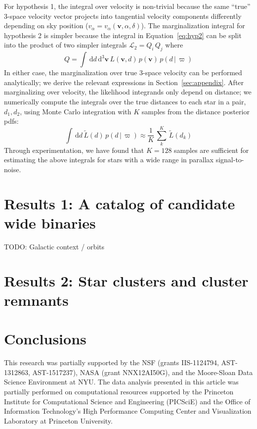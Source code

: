 \documentclass[manuscript, letterpaper]{aastex6}
\newcommand{\acronym}[1]{{\small{#1}}}
\newcommand{\sectionname}{Section}
\newcommand{\eqname}{Equation}
\newcommand{\given}{\,|\,}
\newcommand{\dd}{\mathrm{d}}
\newcommand{\bs}[1]{\boldsymbol{#1}}
\newcommand{\todo}[1]{{\color{red}TODO: #1}}
\begin{document}
For hypothesis 1, the integral over velocity is non-trivial because the same
``true'' 3-space velocity vector projects into tangential velocity components
differently depending on sky position ($v_\alpha = v_\alpha(\bs{v}, \alpha,
\delta)$). The marginalization integral for hypothesis 2 is simpler because the
integral in \eqname~\ref{eq:hyp2} can be split into the product of two simpler
integrals $\mathcal{L}_2 = Q_i \, Q_j$ where
\begin{equation}
  Q = \int \, \dd d \, \dd^3 \bs{v} \, L(\bs{v}, d) \, p(\bs{v}) \, p(d\given\varpi)
\end{equation}
In either case, the marginalization over true 3-space velocity can be performed
analytically; we derive the relevant expressions in
\sectionname~\ref{sec:appendix}. After marginalizing over velocity, the
likelihood integrands only depend on distance; we numerically compute the
integrals over the true distances to each star in a pair, $d_1,d_2$, using Monte
Carlo integration with $K$ samples from the distance posterior pdfs:
\begin{equation}
  \int \, \dd d \, \tilde{L}(d) \, p(d\given\varpi) \approx
    \frac{1}{K} \, \sum_k^K \, \tilde{L}(d_k)
\end{equation}
Through experimentation, we have found that $K=128$ samples are sufficient for
estimating the above integrals for stars with a wide range in parallax
signal-to-noise.

\section{Results 1: A catalog of candidate wide binaries}

\todo{Galactic context / orbits}

\section{Results 2: Star clusters and cluster remnants}

\section{Conclusions}

\acknowledgements

This research was partially supported by the \acronym{NSF} (grants
  \acronym{IIS-1124794}, \acronym{AST-1312863}, \acronym{AST-1517237}),
  \acronym{NASA} (grant \acronym{NNX12AI50G}),
  and the Moore-Sloan Data Science Environment at \acronym{NYU}. The data
analysis presented in this article was partially performed on computational
resources supported by the Princeton Institute for Computational Science and
Engineering (PICSciE) and the Office of Information Technology's High
Performance Computing Center and Visualization Laboratory at Princeton
University.
\end{document}
